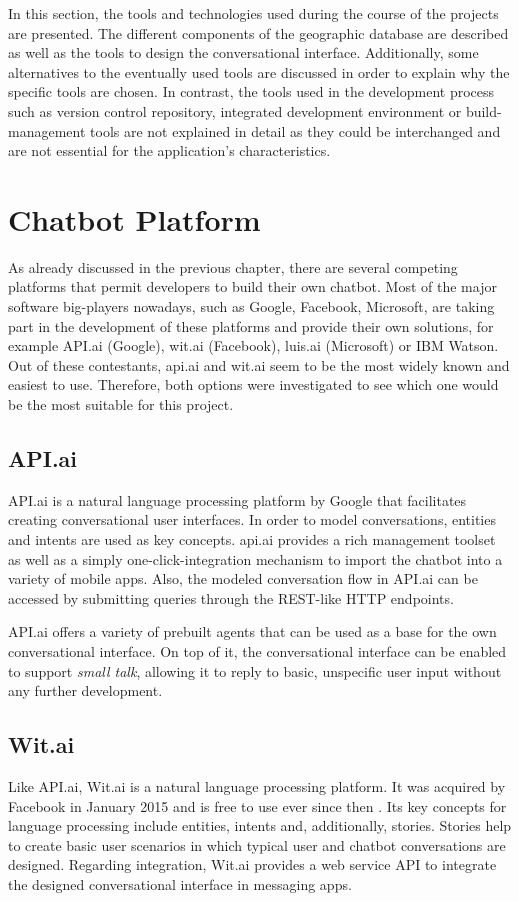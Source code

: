 
In this section, the tools and technologies used during the course of the projects are presented. The different components of the geographic database are described as well as the tools to design the conversational interface. Additionally, some alternatives to the eventually used tools are discussed in order to explain why the specific tools are chosen.
In contrast, the tools used in the development process such as version control repository, integrated development environment or build-management tools are not explained in detail as they could be interchanged and are not essential for the application’s characteristics.

\section{Chatbot Platform}
As already discussed in the previous chapter, there are several competing platforms that permit developers to build their own chatbot. Most of the major software big-players nowadays, such as Google, Facebook, Microsoft, are taking part in the development of these platforms and provide their own solutions, for example API.ai (Google), wit.ai (Facebook), luis.ai (Microsoft) or IBM Watson. Out of these contestants, api.ai and wit.ai seem to be the most widely known and easiest to use. Therefore, both options were investigated to see which one would be the most suitable for this project. 
\subsection{API.ai}
API.ai \cite{apiai} is a natural language processing platform by Google that facilitates creating conversational user interfaces. In order to model conversations, entities and intents are used as key concepts. api.ai provides a rich management toolset as well as a simply one-click-integration mechanism to import the chatbot into a variety of mobile apps. Also, the modeled conversation flow in API.ai can be accessed by submitting queries through the REST-like HTTP endpoints. 

API.ai offers a variety of prebuilt agents that can be used as a base for the own conversational interface. On top of it, the conversational interface can be enabled to support \textit{small talk}, allowing it to reply to basic, unspecific user input without any further development.

\subsection{Wit.ai}
Like API.ai, Wit.ai is a natural language processing platform. It was acquired by Facebook in January 2015 and is free to use ever since then \cite{witai:facebook}. Its key concepts for language processing include entities, intents and, additionally, stories. Stories help to create basic user scenarios in which typical user and chatbot conversations are designed. Regarding integration, Wit.ai provides a web service API to integrate the designed conversational interface in messaging apps.

